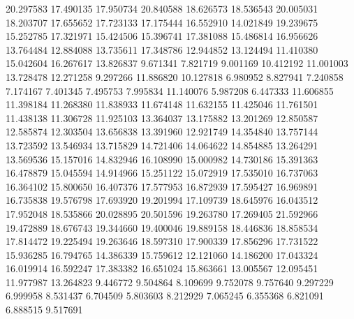 20.297583
17.490135
17.950734
20.840588
18.626573
18.536543
20.005031
18.203707
17.655652
17.723133
17.175444
16.552910
14.021849
19.239675
15.252785
17.321971
15.424506
15.396741
17.381088
15.486814
16.956626
13.764484
12.884088
13.735611
17.348786
12.944852
13.124494
11.410380
15.042604
16.267617
13.826837
9.671341
7.821719
9.001169
10.412192
11.001003
13.728478
12.271258
9.297266
11.886820
10.127818
6.980952
8.827941
7.240858
7.174167
7.401345
7.495753
7.995834
11.140076
5.987208
6.447333
11.606855
11.398184
11.268380
11.838933
11.674148
11.632155
11.425046
11.761501
11.438138
11.306728
11.925103
13.364037
13.175882
13.201269
12.850587
12.585874
12.303504
13.656838
13.391960
12.921749
14.354840
13.757144
13.723592
13.546934
13.715829
14.721406
14.064622
14.854885
13.264291
13.569536
15.157016
14.832946
16.108990
15.000982
14.730186
15.391363
16.478879
15.045594
14.914966
15.251122
15.072919
17.535010
16.737063
16.364102
15.800650
16.407376
17.577953
16.872939
17.595427
16.969891
16.735838
19.576798
17.693920
19.201994
17.109739
18.645976
16.043512
17.952048
18.535866
20.028895
20.501596
19.263780
17.269405
21.592966
19.472889
18.676743
19.344660
19.400046
19.889158
18.446836
18.858534
17.814472
19.225494
19.263646
18.597310
17.900339
17.856296
17.731522
15.936285
16.794765
14.386339
15.759612
12.121060
14.186200
17.043324
16.019914
16.592247
17.383382
16.651024
15.863661
13.005567
12.095451
11.977987
13.264823
9.446772
9.504864
8.109699
9.752078
9.757640
9.297229
6.999958
8.531437
6.704509
5.803603
8.212929
7.065245
6.355368
6.821091
6.888515
9.517691
